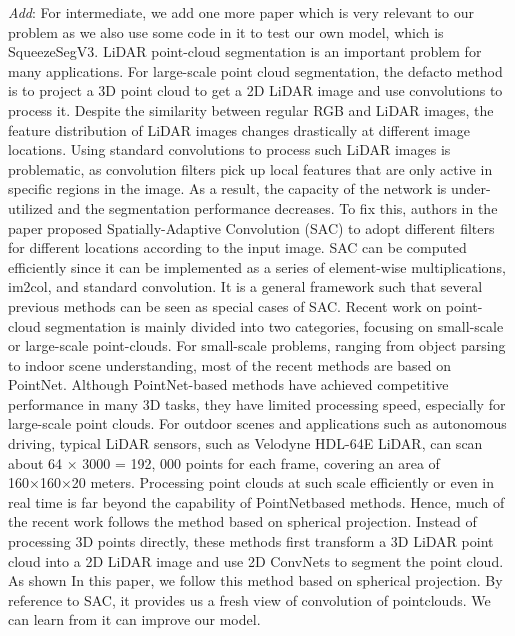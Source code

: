 \documentclass{article}
\begin{document}
\begin{normalsize}
\begin{itemize}
\end{itemize}
      \emph{Add}: For intermediate, we add one more paper which is very relevant to our problem as we also use some code in it to test our own model, which is SqueezeSegV3\cite{xu2020squeezesegv3}. LiDAR point-cloud segmentation is an important problem for many applications. For large-scale point cloud segmentation, the defacto method is to project a 3D point cloud to get a 2D LiDAR image and use convolutions to process it. Despite the similarity between regular RGB and LiDAR images, the feature distribution of LiDAR images changes drastically at different image locations. Using standard convolutions to process such LiDAR images is problematic, as convolution filters pick up local features that are only active in specific regions in the image. As a result, the capacity of the network is under-utilized and the segmentation performance decreases. To fix this, authors in the paper proposed Spatially-Adaptive Convolution (SAC) to adopt different filters for different locations according to the input image. SAC can be computed efficiently since it can be implemented as a series of element-wise multiplications, im2col, and standard convolution. It is a general framework such that several previous methods can be seen as 
      special cases of SAC. Recent work on point-cloud segmentation is mainly divided into two categories, focusing on small-scale or large-scale point-clouds. For small-scale problems, ranging from object parsing to indoor scene understanding, most of the recent methods are based on PointNet. Although PointNet-based methods have achieved competitive performance in many 3D tasks, they have limited processing speed, especially for large-scale point clouds. For outdoor scenes and applications such as autonomous driving, typical LiDAR sensors, such as Velodyne HDL-64E LiDAR, can scan about 64 × 3000 = 192, 000 points for each frame, covering an area of 160×160×20 meters. Processing point clouds at such scale efficiently or even in real time is far beyond the capability of PointNetbased methods. Hence, much of the recent work follows the method based on spherical projection. Instead of processing 3D points directly, these methods first transform a 3D LiDAR point cloud into a 2D LiDAR image and use 2D ConvNets to segment the point cloud. As shown In this paper, we follow this method based on spherical projection. 
      By reference to SAC, it provides us a fresh view of convolution of pointclouds. We can learn from it can improve our model.
 



\end{normalsize}
\end{document}
